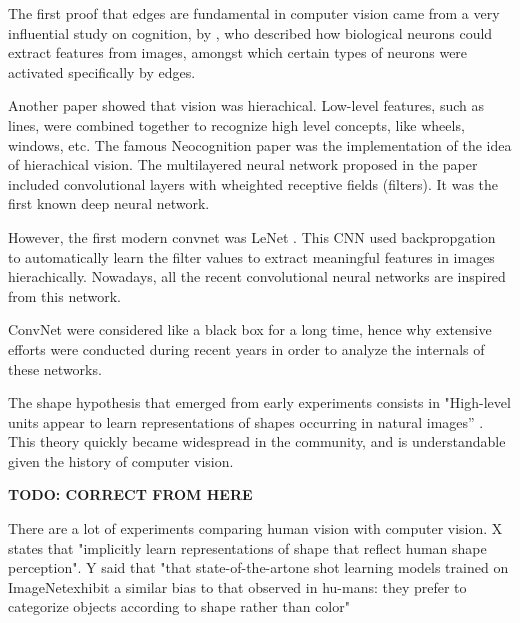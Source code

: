 \documentclass{article}
\begin{document}
\noindent
The first proof that edges are fundamental in computer vision came from a very influential study on cognition, 
by \cite{hubel1959receptive}, who described how biological neurons could extract features from images,
amongst which certain types of neurons were activated specifically by edges. \smallskip



\noindent
Another paper showed that vision was hierachical. Low-level features, such as lines,
were combined together to recognize high level concepts, like wheels, windows, etc. 
The famous Neocognition paper \cite{neocognitron} was the implementation of the idea of hierachical vision.
The multilayered neural network proposed in the paper included convolutional layers with wheighted receptive fields (filters).
It was the first known deep neural network. \smallskip

\noindent
However, the first modern convnet was LeNet \cite{Lecun98gradient-basedlearning}.
This CNN used backpropgation to automatically learn the filter values to extract meaningful 
features in images hierachically.
Nowadays, all the recent convolutional neural networks are inspired from this network. \smallskip

\noindent
ConvNet were considered like a black box for a long time, 
hence why extensive efforts were conducted during recent years in order 
to analyze the internals of these networks. \smallskip

\noindent
The shape hypothesis that emerged from early experiments consists in
"High-level units appear to learn representations of shapes occurring in natural images” 
\cite{Kriegeskorte029876}. This theory quickly became widespread in the community, and
is understandable given the history of computer vision. 

\textbf{TODO: CORRECT FROM HERE}

There are a lot of experiments comparing human vision with computer vision.
X states that "implicitly learn representations of shape
 that reflect human shape perception".
Y said that "that  state-of-the-artone  shot  learning  models  trained  on  ImageNetexhibit  a  similar  bias  to  that  observed  in  hu-mans:  
they prefer to categorize objects according  to  shape  rather  than  color" \cite{ritter2017cognitive}
\end{document}
